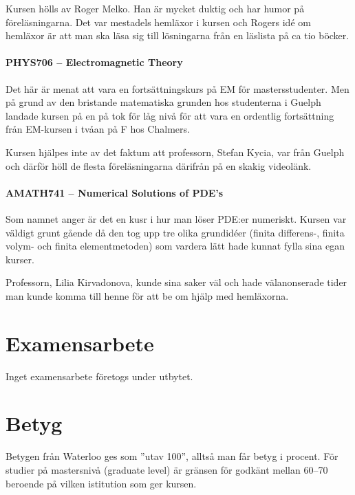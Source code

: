 \documentclass[11pt,a4paper, english, swedish]{article}
\begin{document}
Kursen hölls av Roger Melko. Han är mycket duktig och har humor på
föreläsningarna. Det var mestadels hemläxor i kursen och Rogers idé om
hemläxor är att man ska läsa sig till lösningarna från en läslista på
ca tio böcker. 

\paragraph{PHYS706 --  Electromagnetic Theory}
Det här är menat att vara en fortsättningskurs på EM för
mastersstudenter. Men på grund av den bristande matematiska grunden
hos studenterna i Guelph landade kursen på en på tok för låg nivå för
att vara en ordentlig fortsättning från EM-kursen i tvåan på F hos
Chalmers.  

Kursen hjälpes inte av det faktum att professorn, Stefan Kycia, var
från Guelph och därför höll de flesta föreläsningarna därifrån på en
skakig videolänk. 

\paragraph{AMATH741 -- Numerical Solutions of PDE's}
Som namnet anger är det en kusr i hur man löser PDE:er
numeriskt. Kursen var väldigt grunt gående då den tog upp tre olika
grundidéer (finita differens-, finita volym- och finita
elementmetoden) som vardera lätt hade kunnat fylla sina egan kurser.  

Professorn, Lilia Kirvadonova, kunde sina saker väl och hade
välanonserade tider man kunde komma till henne för att be om hjälp med
hemläxorna. 


\section{Examensarbete}
Inget examensarbete företogs under utbytet.


\section{Betyg}
Betygen från Waterloo ges som ''utav 100'', alltså man får betyg i
procent. För studier på mastersnivå (graduate level) är gränsen för
godkänt mellan 60--70 beroende på vilken istitution som ger kursen. 
\end{document}
